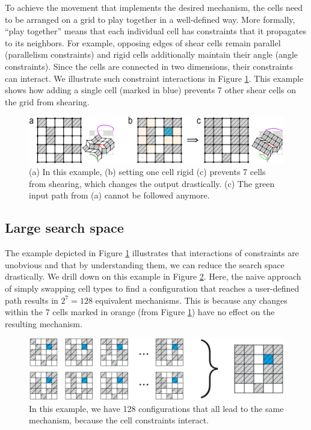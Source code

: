 To achieve the movement that implements the desired mechanism, the cells need to be arranged on a grid to play together in a well-defined way. More formally, “play together” means that each individual cell has constraints that it propagates to its neighbors. For example, opposing edges of shear cells remain parallel (parallelism constraints) and rigid cells additionally maintain their angle (angle constraints). Since the cells are connected in two dimensions, their constraints can interact. We illustrate such constraint interactions in Figure \ref{fig:4-constraint-interaction}. This example shows how adding a single cell (marked in blue) prevents 7 other shear cells on the grid from shearing.

\begin{figure} [h]
    \includegraphics[width=\textwidth]{chapters/understanding-metamaterial-mechanisms-FIG/4-constraint-interaction.png}
    \caption[Short figure name.]{(a) In this example, (b) setting one cell rigid (c) prevents 7 cells from shearing, which changes the output drastically. (c) The green input path from (a) cannot be followed anymore.
    \label{fig:4-constraint-interaction}}
\end{figure}

\subsection{Large search space}
The example depicted in Figure \ref{fig:4-constraint-interaction} illustrates that interactions of constraints are unobvious and that by understanding them, we can reduce the search space drastically. We drill down on this example in Figure \ref{fig:5-large-search-space}. Here, the naive approach of simply swapping cell types to find a configuration that reaches a user-defined path results in $2^7=128$ equivalent mechanisms. This is because any changes within the 7 cells marked in orange (from Figure \ref{fig:4-constraint-interaction}) have no effect on the resulting mechanism. 

\begin{figure} [h]
    \includegraphics[width=\textwidth]{chapters/understanding-metamaterial-mechanisms-FIG/5-large-search-space.png}
    \caption[Short figure name.]{In this example, we have 128 configurations that all lead to the same mechanism, because the cell constraints interact. 
    \label{fig:5-large-search-space}}
\end{figure}

